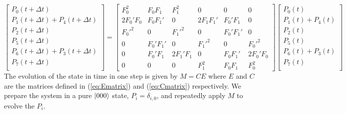 \documentclass{report}
\begin{document}
\begin{equation} \label{eq:Cmatrix}
    \begin{bmatrix}
        P_0(t+\Delta t) \\
        P_1(t+\Delta t) + P_4(t+\Delta t) \\
        P_2(t+\Delta t) \\
        P_5(t+\Delta t) \\
        P_6(t+\Delta t)  + P_3(t + \Delta t)\\
        P_7(t+\Delta t) \\
    \end{bmatrix}
    =
    \begin{bmatrix}
        F_0^2 & F_0 F_1 & F_1^2 & 0 & 0 & 0 \\
        2F_0'F_0 & F_0 F_1' & 0 & 2F_1 F_1' & F_0' F_1 & 0\\
        F_0'^2 & 0 & F_1'^2 & 0 & F_0' F_1' & 0 \\
        0 & F_0' F_1' & 0 & F_1'^2 & 0 &F_0'^2 \\
        0 &F_0' F_1 & 2F_1' F_1&0&F_0F_1'&2F_0'F_0 \\
        0&0&0& F_1^2 &F_0 F_1 & F_0^2
    \end{bmatrix}
    \begin{bmatrix}
        P_0(t) \\
        P_1(t) + P_4(t) \\
        P_2(t) \\
        P_5(t) \\
        P_6(t)  + P_3(t)\\
        P_7(t) \\
    \end{bmatrix}
\end{equation}
The evolution of the state in time in one step is given by $M = CE$ where $E$ and $C$ are the matrices defined in (\ref{eq:Ematrix}) and (\ref{eq:Cmatrix}) respectively. We prepare the system in a pure $\ket{000}$ state, $P_i = \delta_{i,0}$, and repeatedly apply $M$ to evolve the $P_i$.  
\end{document}
